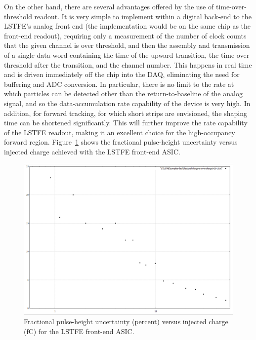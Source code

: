 \documentclass[12pt]{report}
\begin{document}
On the other hand, there are several advantages offered by the use of time-over-threshold readout. It is very simple 
to implement within a digital back-end to the LSTFE's analog front end (the implementation would be on the same chip 
as the front-end readout), requiring only a measurement of the number of clock counts that the given channel is over 
threshold, and then the assembly and transmission of a
single data word containing the time of the upward transition, the time over threshold after the transition, and the 
channel number. This happens in real time and is driven immediately off the chip into the DAQ, eliminating the need 
for buffering and ADC conversion. In particular, there is no limit to the rate at which particles can be detected 
other than the return-to-baseline of the analog signal, and so the data-accumulation rate capability of the device 
is very high. In addition, for forward tracking, for which short strips are envisioned, the shaping time can be 
shortened significantly. This will further improve the rate capability of the LSTFE readout, making it an excellent 
choice for the high-occupancy forward region.
Figure~\ref{fig:Tracker:SCIPP:LSTFE} shows the fractional pulse-height uncertainty versus 
injected charge achieved with the LSTFE front-end ASIC.

\begin{figure}
\includegraphics{Tracker/SCIPPTracking/SCIPPTracking}
\caption{Fractional pulse-height uncertainty (percent) versus injected charge (fC) for the LSTFE front-end ASIC.}
\label{fig:Tracker:SCIPP:LSTFE}
\end{figure}
\end{document}
